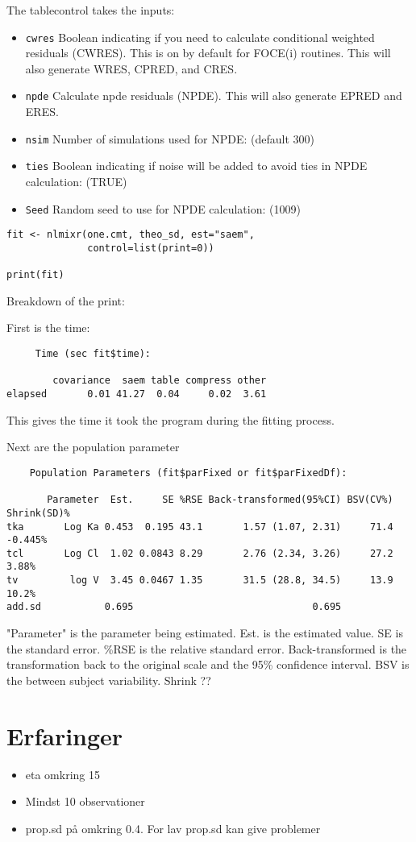 The tablecontrol takes the inputs: 
\begin{itemize}
  \item \texttt{cwres} \hfill Boolean indicating if you need to calculate conditional weighted residuals (CWRES). This is on by default for FOCE(i) routines. This will also generate WRES, CPRED, and CRES.
  \item \texttt{npde} \hfill Calculate npde residuals (NPDE). This will also generate EPRED and ERES.
  \item \texttt{nsim} \hfill Number of simulations used for NPDE: (default 300)
  \item \texttt{ties} \hfill Boolean indicating if noise will be added to avoid ties in NPDE calculation: (TRUE)
  \item \texttt{Seed} \hfill Random seed to use for NPDE calculation: (1009)
\end{itemize}


\begin{lstlisting}
fit <- nlmixr(one.cmt, theo_sd, est="saem",
              control=list(print=0))

print(fit)
\end{lstlisting}

Breakdown of the print: 

First is the time:
\begin{lstlisting}
     Time (sec fit$time):

        covariance  saem table compress other
elapsed       0.01 41.27  0.04     0.02  3.61
\end{lstlisting}
This gives the time it took the program during the fitting process. 

Next are the population parameter
\begin{lstlisting}
    Population Parameters (fit$parFixed or fit$parFixedDf):

       Parameter  Est.     SE %RSE Back-transformed(95%CI) BSV(CV%) Shrink(SD)%
tka       Log Ka 0.453  0.195 43.1       1.57 (1.07, 2.31)     71.4    -0.445%
tcl       Log Cl  1.02 0.0843 8.29       2.76 (2.34, 3.26)     27.2      3.88%
tv         log V  3.45 0.0467 1.35       31.5 (28.8, 34.5)     13.9      10.2%
add.sd           0.695                               0.695
\end{lstlisting}
"Parameter" is the parameter being estimated. Est. is the estimated value. SE is the standard error. \%RSE is the relative standard error. Back-transformed is the transformation back to the original scale and the 95\% confidence interval. BSV is the between subject variability. Shrink ??




\section{Erfaringer}
\begin{itemize}
    \item eta omkring 15
    \item Mindst 10 observationer
    \item prop.sd på omkring 0.4. For lav prop.sd kan give problemer
\end{itemize}


